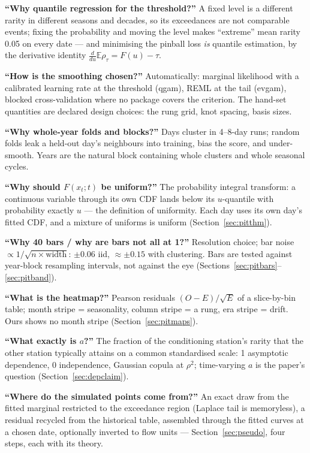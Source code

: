 \documentclass[11pt]{article}
\begin{document}
\textbf{``Why quantile regression for the threshold?''} A fixed level is a
different rarity in different seasons and decades, so its exceedances are not
comparable events; fixing the probability and moving the level makes
``extreme'' mean rarity 0.05 on every date --- and minimising the pinball
loss \emph{is} quantile estimation, by the derivative identity
$\frac{d}{du}\mathbb{E}\rho_\tau = F(u) - \tau$.

\textbf{``How is the smoothing chosen?''} Automatically: marginal likelihood
with a calibrated learning rate at the threshold (qgam), REML at the tail
(evgam), blocked cross-validation where no package covers the criterion. The
hand-set quantities are declared design choices: the rung grid, knot
spacing, basis sizes.

\textbf{``Why whole-year folds and blocks?''} Days cluster in 4--8-day runs;
random folds leak a held-out day's neighbours into training, bias the score,
and under-smooth. Years are the natural block containing whole clusters and
whole seasonal cycles.

\textbf{``Why should $F(x_t;t)$ be uniform?''} The probability integral
transform: a continuous variable through its own CDF lands below its
$u$-quantile with probability exactly $u$ --- the definition of uniformity.
Each day uses its own day's fitted CDF, and a mixture of uniforms is
uniform (Section~\ref{sec:pitthm}).

\textbf{``Why 40 bars / why are bars not all at 1?''} Resolution choice;
bar noise $\propto 1/\sqrt{n \times \mathrm{width}}$: $\pm 0.06$ iid,
$\approx \pm 0.15$ with clustering. Bars are tested against year-block
resampling intervals, not against the eye
(Sections~\ref{sec:pitbars}--\ref{sec:pitband}).

\textbf{``What is the heatmap?''} Pearson residuals $(O-E)/\sqrt{E}$ of a
slice-by-bin table; month stripe = seasonality, column stripe = a rung, era
stripe = drift. Ours shows no month stripe (Section~\ref{sec:pitmaps}).

\textbf{``What exactly is $a$?''} The fraction of the conditioning station's
rarity that the other station typically attains on a common standardised
scale: 1 asymptotic dependence, 0 independence, Gaussian copula at $\rho^2$;
time-varying $a$ is the paper's question (Section~\ref{sec:depclaim}).

\textbf{``Where do the simulated points come from?''} An exact draw from the
fitted marginal restricted to the exceedance region (Laplace tail is
memoryless), a residual recycled from the historical table, assembled through
the fitted curves at a chosen date, optionally inverted to flow units ---
Section~\ref{sec:pseudo}, four steps, each with its theory.
\end{document}
